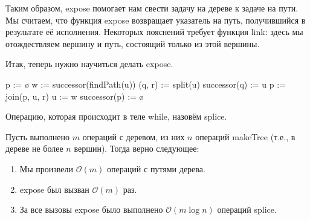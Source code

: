 Таким образом, expose помогает нам свести задачу на дереве к задаче на пути. Мы считаем, что функция expose возвращает указатель на путь, получившийся в результате её исполнения. Некоторых пояснений требует функция link: здесь мы отождествляем вершину и путь, состоящий только из этой вершины.

Итак, теперь нужно научиться делать expose.

\begin{algorithmic}[1]

		\State p := \o {}
		    \State w := successor(findPath(u)) 
		    \State (q, r) := split(u) 
		     
		        \State successor(q) := u 
		    \EndIf
		    \State p := join(p, u, r) 
		    \State u := w 
		\EndWhile
		\State successor(p) := \o
    \EndProcedure
    
\end{algorithmic}

Операцию, которая происходит в теле while, назовём splice.

\begin{theorem}
Пусть выполнено $m$ операций с деревом, из них $n$ операций makeTree (т.е., в дереве не более $n$ вершин). Тогда верно следующее:

\begin{enumerate}
    \item Мы произвели $\mathcal{O}(m)$ операций с путями дерева.
    \item expose был вызван $\mathcal{O}(m)$ раз.
    \item За все вызовы expose было выполнено $\mathcal{O}(m \log{n})$ операций splice.
\end{enumerate}
\end{theorem}

